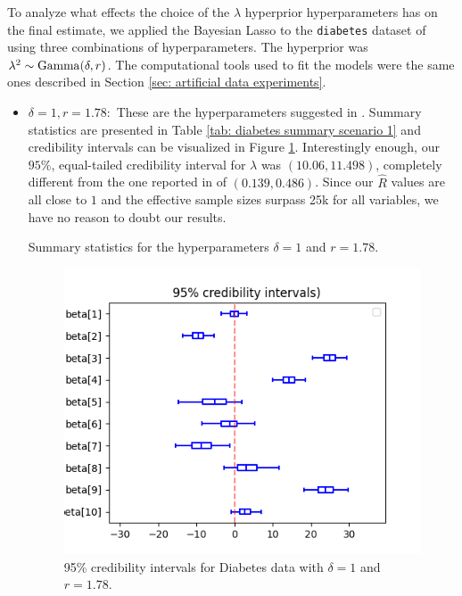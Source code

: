 \documentclass[a4paper, 10pt]{article}
\begin{document}
To analyze what effects the choice of the $ \lambda $ hyperprior hyperparameters has on the final estimate, we applied the Bayesian Lasso to the \texttt{diabetes} dataset of \cite{effron-2004-diabetes} using three combinations of hyperparameters.
The hyperprior was $ \lambda^2 \sim \operatorname{Gamma} (\delta, r) $.
The computational tools used to fit the models were the same ones described in Section \ref{sec: artificial data experiments}.

\begin{itemize}
    \item $ \delta = 1, r = 1.78: $
    These are the hyperparameters suggested in \cite{parkcasella2008bayesianlasso}.
    Summary statistics are presented in Table \ref{tab: diabetes summary scenario 1} and credibility intervals can be visualized in Figure \ref{fig: diabetes credibility scenario 1}.
    Interestingly enough, our $ 95\% $, equal-tailed credibility interval for $ \lambda $ was $ ( 10.06, 11.498 ) $, completely different from the one reported in \cite{parkcasella2008bayesianlasso} of $ ( 0.139, 0.486  ) $.
    Since our $ \hat{ R } $ values are all close to $ 1 $ and the effective sample sizes surpass 25k for all variables, we have no reason to doubt our results.
    \begin{table}[htb]
        \centering
        
        \caption{Summary statistics for the hyperparameters $ \delta = 1 $ and $ r = 1.78 $.}
        \label{tab: diabetes summary scenario 1}
    \end{table}
\begin{figure}
    \centering
    \includegraphics[width=.6\textwidth]{../outputs/diabetes_data/scenario_1/credibility_intervals.png}
    \caption{95\% credibility intervals for Diabetes data with $ \delta = 1 $ and $ r = 1.78 $.}
    \label{fig: diabetes credibility scenario 1}
\end{figure}


\end{itemize}
\end{document}
